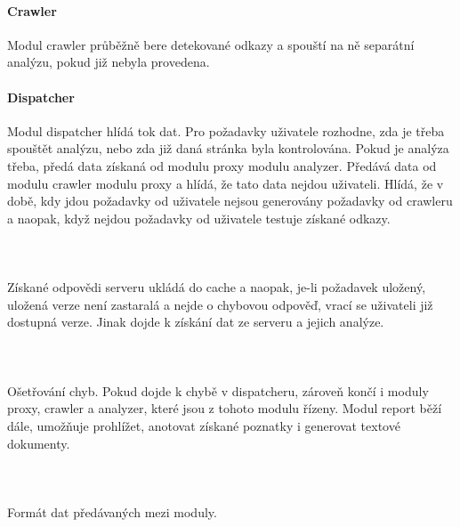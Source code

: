 \documentclass[10pt]{article}
\begin{document}
	\paragraph{Crawler} Modul crawler průběžně bere detekované odkazy a spouští na ně separátní analýzu, pokud již nebyla provedena.
	\paragraph{Dispatcher} Modul dispatcher hlídá tok dat. Pro požadavky uživatele rozhodne, zda je třeba spouštět analýzu, nebo zda již daná stránka byla kontrolována. Pokud je analýza třeba, předá data získaná od modulu proxy modulu analyzer. Předává data od modulu crawler modulu proxy a hlídá, že tato data nejdou uživateli. Hlídá, že v době, kdy jdou požadavky od uživatele nejsou generovány požadavky od crawleru a naopak, když nejdou požadavky od uživatele testuje získané odkazy. 
	\paragraph{~} Získané odpovědi serveru ukládá do cache a naopak, je-li požadavek uložený, uložená verze není zastaralá a nejde o chybovou odpověď, vrací se uživateli již dostupná verze. Jinak dojde k získání dat ze serveru a jejich analýze.
	\paragraph{~} Ošetřování chyb. Pokud dojde k chybě v dispatcheru, zároveň končí i moduly proxy, crawler a analyzer, které jsou z tohoto modulu řízeny. Modul report běží dále, umožňuje prohlížet, anotovat získané poznatky i generovat textové dokumenty.
	\paragraph{~} Formát dat předávaných mezi moduly.
	
\end{document}
